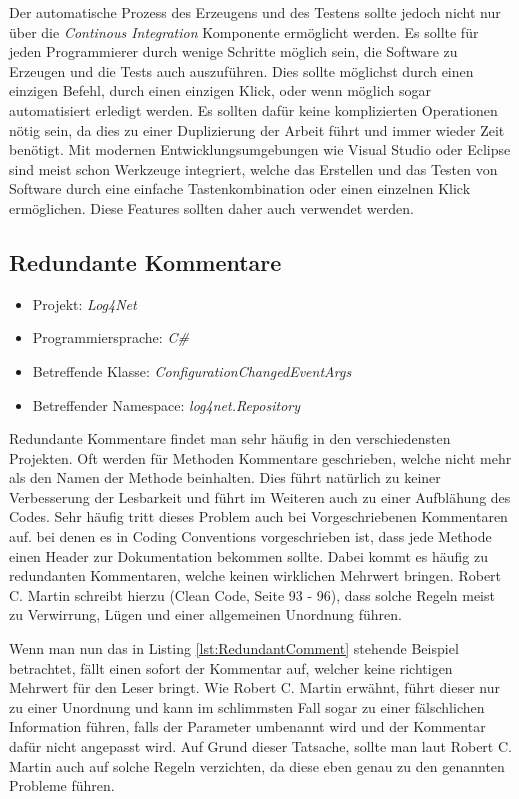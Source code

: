 \SuperPar Der automatische Prozess des Erzeugens und des Testens sollte jedoch nicht nur über die \textit{Continous Integration} Komponente ermöglicht werden. Es sollte für jeden Programmierer durch wenige Schritte möglich sein, die Software zu Erzeugen und die Tests auch auszuführen. Dies sollte möglichst durch einen einzigen Befehl, durch einen einzigen Klick, oder wenn möglich sogar automatisiert erledigt werden. Es sollten dafür keine komplizierten Operationen nötig sein, da dies zu einer Duplizierung der Arbeit führt und immer wieder Zeit benötigt. Mit modernen Entwicklungsumgebungen wie Visual Studio oder Eclipse sind meist schon Werkzeuge integriert, welche das Erstellen und das Testen von Software durch eine einfache Tastenkombination oder einen einzelnen Klick ermöglichen. Diese Features sollten daher auch verwendet werden.

\subsection{Redundante Kommentare}
\begin{itemize}
	\item Projekt: \textit{Log4Net}
	\item Programmiersprache: \textit{C\#}
	\item Betreffende Klasse: \textit{ConfigurationChangedEventArgs}
	\item Betreffender Namespace: \textit{log4net.Repository}
\end{itemize}

\SuperPar Redundante Kommentare findet man sehr häufig in den verschiedensten Projekten. Oft werden für Methoden Kommentare geschrieben, welche nicht mehr als den Namen der Methode beinhalten. Dies führt natürlich zu keiner Verbesserung der Lesbarkeit und führt im Weiteren auch zu einer Aufblähung des Codes. Sehr häufig tritt dieses Problem auch bei Vorgeschriebenen Kommentaren auf. bei denen es in Coding Conventions vorgeschrieben ist, dass jede Methode einen Header zur Dokumentation
bekommen sollte. Dabei kommt es häufig zu redundanten Kommentaren, welche keinen wirklichen Mehrwert bringen. Robert C. Martin schreibt hierzu (Clean Code, Seite 93 - 96), dass solche Regeln meist zu Verwirrung, Lügen und einer allgemeinen Unordnung führen. 

\SuperPar Wenn man nun das in Listing \ref{lst:RedundantComment} stehende Beispiel betrachtet, fällt einen sofort der Kommentar auf, welcher keine richtigen Mehrwert
für den Leser bringt. Wie Robert C. Martin erwähnt, führt dieser nur zu einer Unordnung und kann im schlimmsten Fall sogar zu einer fälschlichen Information führen,
falls der Parameter umbenannt wird und der Kommentar dafür nicht angepasst wird. Auf Grund dieser Tatsache, sollte man laut Robert C. Martin auch auf solche Regeln verzichten, da diese eben genau zu den genannten Probleme führen.

